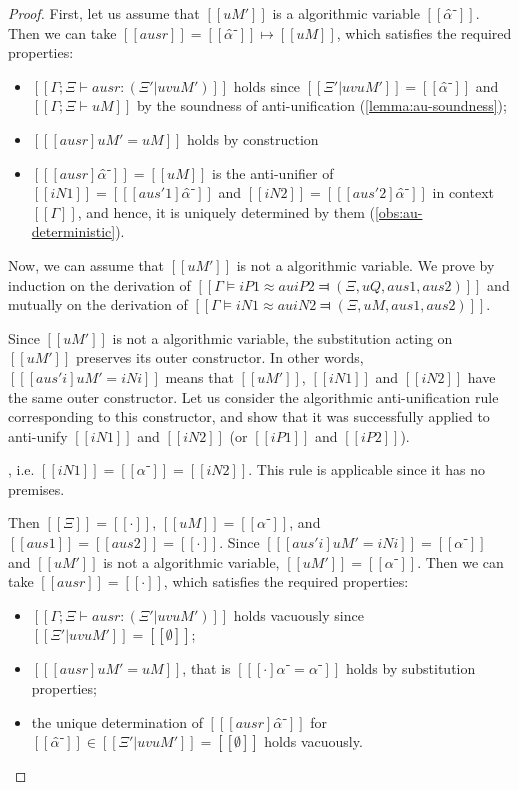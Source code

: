 \begin{proof}
    First, let us assume that $[[uM']]$ is a algorithmic variable $[[α̂⁻]]$. 
    Then we can take $[[ausr]] = [[α̂⁻]] \mapsto [[uM]]$, which satisfies the required properties:
    \begin{itemize}
        \item $[[Γ ; Ξ ⊢ ausr : (Ξ' | uv uM')]]$ holds since 
        $[[Ξ' | uv uM']] = [[{α̂⁻}]]$ and $[[Γ ; Ξ ⊢ uM]]$ by the soundness of anti-unification (\cref{lemma:au-soundness});
        \item $[[ [ausr] uM' = uM ]]$ holds by construction
        \item $[[ [ausr]α̂⁻]] = [[uM]]$ is the anti-unifier of 
            $[[iN1]] = [[ [aus'1] α̂⁻]]$ and $[[iN2]] = [[ [aus'2] α̂⁻]]$
            in context $[[Γ]]$, and hence, it is uniquely determined by them (\cref{obs:au-deterministic}).
    \end{itemize}

    Now, we can assume that $[[uM']]$ is not a algorithmic variable. 
    We prove by induction on the derivation of $[[Γ ⊨ iP1 ≈au iP2 ⫤ (Ξ, uQ, aus1, aus2)]]$
    and mutually on the derivation of $[[Γ ⊨ iN1 ≈au iN2 ⫤ (Ξ, uM, aus1, aus2)]]$.

    Since $[[uM']]$ is not a algorithmic variable, 
    the substitution acting on $[[uM']]$ preserves its outer constructor. 
    In other words, 
    $[[ [aus'i] uM' = iNi ]]$ means that $[[uM']]$, 
    $[[iN1]]$ and $[[iN2]]$ have the same outer constructor. 
    Let us consider the algorithmic anti-unification rule corresponding to this constructor, 
    and show that it was successfully applied to anti-unify $[[iN1]]$ and $[[iN2]]$ 
    (or $[[iP1]]$ and $[[iP2]]$).

    \begin{caseof}
        \item {}, i.e. $[[iN1]] = [[α⁻]] = [[iN2]]$.
        \label{case:anti-unification-initial:nvar}
        This rule is applicable since it has no premises. 
        
        Then $[[Ξ]] = [[·]]$, $[[uM]] = [[α⁻]]$, 
        and $[[aus1]] = [[aus2]] = [[·]]$.
        Since $[[ [aus'i] uM' = iNi ]] = [[α⁻]]$
        and $[[uM']]$ is not a algorithmic variable, $[[uM']] = [[α⁻]]$.
        Then we can take $[[ausr]] = [[·]]$, which satisfies the required properties:
        \begin{itemize}
            \item $[[Γ ; Ξ ⊢ ausr : (Ξ' | uv uM')]]$ holds vacuously since 
            $[[Ξ' | uv uM']] = [[∅]]$; 
            \item $[[ [ausr] uM' = uM ]]$, that is $[[ [·] α⁻ = α⁻ ]]$
            holds by substitution properties;
            \item the unique determination of $[[ [ausr]α̂⁻]]$ for $[[α̂⁻]] \in [[Ξ' | uv uM']] = [[∅]]$ holds vacuously.
        \end{itemize}


\end{caseof}
\end{proof}
